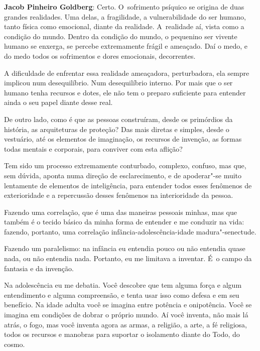  

\textbf{Jacob Pinheiro Goldberg}: Certo. O~sofrimento psíquico se
origina de duas grandes realidades. Uma delas, a fragilidade, a
vulnerabilidade do ser humano, tanto física como emocional, diante da
realidade. A~realidade aí, vista como a condição do mundo. Dentro da
condição do mundo, o pequenino ser vivente humano se enxerga, se
percebe extremamente frágil e ameaçado. Daí o medo, e do medo todos os
sofrimentos e dores emocionais, decorrentes.

 

A dificuldade de enfrentar essa realidade ameaçadora, perturbadora, ela
sempre implicou num desequilíbrio. Num desequilíbrio interno. Por mais
que o ser humano tenha recursos e dotes, ele não tem o preparo
suficiente para entender ainda o seu papel diante desse real.

 

De outro lado, como é que as pessoas construíram, desde os primórdios da
história, as arquiteturas de proteção? Das mais diretas e simples, desde
o vestuário, até os elementos de imaginação, os recursos de invenção, as
formas todas mentais e corporais, para conviver com esta aflição?

 

Tem sido um processo extremamente conturbado, complexo, confuso, mas que,
sem dúvida, aponta numa direção de esclarecimento, e de apoderar"-se muito
lentamente de elementos de inteligência, para entender todos esses
fenômenos de exterioridade e a repercussão desses fenômenos na
interioridade da pessoa.

 

Fazendo uma correlação, que é uma das maneiras pessoais minhas, mas que
também é o tecido básico da minha forma de entender e me conduzir na
vida: fazendo, portanto, uma correlação infância-adolescência-idade
madura"-senectude.

 

Fazendo um paralelismo: na infância eu entendia pouco ou não entendia
quase nada, ou não entendia nada. Portanto, eu me limitava a inventar. É~o campo da fantasia e da invenção.

 

Na adolescência eu me debatia. Você descobre que tem alguma força e
algum entendimento e alguma compreensão, e tenta usar isso como defesa e
em seu benefício. Na idade adulta você se imagina entre potência e onipotência.
Você se imagina em condições de dobrar o próprio mundo. Aí você inventa,
não mais lá atrás, o fogo, mas você inventa agora as armas, a religião,
a arte, a fé religiosa, todos os recursos e manobras para suportar o
isolamento diante do Todo, do cosmo.

